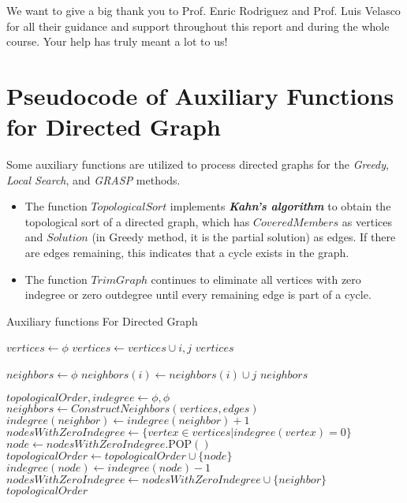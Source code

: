 \documentclass{article}
\begin{document}
We want to give a big thank you to Prof. Enric Rodriguez and Prof. Luis Velasco for all their guidance and support throughout this report and during the whole course. Your help has truly meant a lot to us!

\newpage
\appendix

\section{Pseudocode of Auxiliary Functions for Directed Graph}


Some auxiliary functions are utilized to process directed graphs for the \textit{Greedy}, \textit{Local Search}, and \textit{GRASP} methods.
\begin{itemize}
    \item The function $TopologicalSort$ implements \textbf{\textit{Kahn's algorithm}} to obtain the topological sort of a directed graph, which has $CoveredMembers$ as vertices and $Solution$ (in Greedy method, it is the partial solution) as edges. If there are edges remaining, this indicates that a cycle exists in the graph.
    \item The function $TrimGraph$ continues to eliminate all vertices with zero indegree or zero outdegree until every remaining edge is part of a cycle.
\end{itemize}

\begin{algorithm}[H]
\renewcommand{\thealgorithm}{}
\caption{Auxiliary functions For Directed Graph}
\begin{algorithmic}

\State $vertices \gets \phi$
\State $vertices \gets vertices \cup {i, j}$
\EndFor
\State \Return $vertices$
\EndFunction

\Statex

\State $neighbors \gets \phi$
\State $neighbors(i) \gets neighbors(i) \cup {j}$
\EndFor
\State \Return $neighbors$
\EndFunction

\Statex

\State $topologicalOrder, indegree \gets \phi, \phi$
\State $neighbors \gets ConstructNeighbors(vertices, edges)$
        \State $indegree(neighbor) \gets indegree(neighbor) + 1$
    \EndFor
\EndFor
\State $nodesWithZeroIndegree \gets \{vertex \in vertices| indegree(vertex) = 0\}$
    \State $node \gets nodesWithZeroIndegree.\textrm{POP}()$
    \State $topologicalOrder \gets topologicalOrder \cup \{node\}$
        \State $indegree(node) \gets indegree(node) - 1$
            \State $nodesWithZeroIndegree \gets nodesWithZeroIndegree \cup \{neighbor\}$
        \EndIf
    \EndFor
\EndWhile
\State \Return $topologicalOrder$
\EndFunction

\end{algorithmic}
\end{algorithm}
\end{document}
